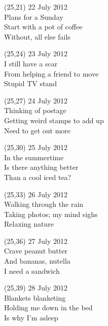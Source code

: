 \documentclass[10pt]{article}
\begin{document}
\begin{textblock}{10}(25,21)
22 July 2012 \\
Plans for a Sunday \\
Start with a pot of coffee \\
Without, all else fails
\end{textblock}

\begin{textblock}{10}(25,24)
23 July 2012 \\
I still have a scar \\
From helping a friend to move \\
Stupid TV stand
\end{textblock}

\begin{textblock}{10}(25,27)
24 July 2012 \\
Thinking of postage \\
Getting weird stamps to add up \\
Need to get out more
\end{textblock}

\begin{textblock}{10}(25,30)
25 July 2012 \\
In the summertime \\
Is there anything better \\
Than a cool iced tea?
\end{textblock}

\begin{textblock}{10}(25,33)
26 July 2012 \\
Walking through the rain \\
Taking photos; my mind sighs \\
Relaxing nature

\end{textblock}

\begin{textblock}{10}(25,36)
27 July 2012 \\
Crave peanut butter \\
And bananas, nutella \\
I need a sandwich
\end{textblock}

\begin{textblock}{10}(25,39)
28 July 2012 \\
Blankets blanketing \\
Holding me down in the bed \\
Is why I'm asleep
\end{textblock}
\end{document}
